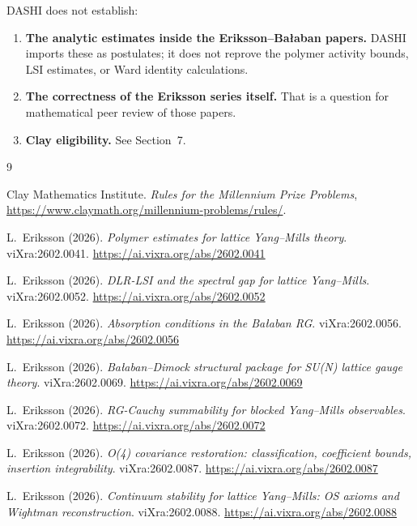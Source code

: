 \documentclass[11pt,a4paper]{article}
\begin{document}
DASHI does not establish:

\begin{enumerate}
\item[(A)] \textbf{The analytic estimates inside the Eriksson--Ba{\l}aban
  papers.}  DASHI imports these as postulates; it does not reprove the
  polymer activity bounds, LSI estimates, or Ward identity calculations.

\item[(B)] \textbf{The correctness of the Eriksson series itself.}  That is a
  question for mathematical peer review of those papers.

\item[(C)] \textbf{Clay eligibility.}  See Section~7.
\end{enumerate}

\begin{thebibliography}{9}

Clay Mathematics Institute.
\emph{Rules for the Millennium Prize Problems},
\url{https://www.claymath.org/millennium-problems/rules/}.

L.~Eriksson (2026).
\emph{Polymer estimates for lattice Yang--Mills theory}.
viXra:2602.0041.
\url{https://ai.vixra.org/abs/2602.0041}

L.~Eriksson (2026).
\emph{DLR-LSI and the spectral gap for lattice Yang--Mills}.
viXra:2602.0052.
\url{https://ai.vixra.org/abs/2602.0052}

L.~Eriksson (2026).
\emph{Absorption conditions in the Ba{\l}aban RG}.
viXra:2602.0056.
\url{https://ai.vixra.org/abs/2602.0056}

L.~Eriksson (2026).
\emph{Ba{\l}aban--Dimock structural package for SU(N) lattice gauge theory}.
viXra:2602.0069.
\url{https://ai.vixra.org/abs/2602.0069}

L.~Eriksson (2026).
\emph{RG-Cauchy summability for blocked Yang--Mills observables}.
viXra:2602.0072.
\url{https://ai.vixra.org/abs/2602.0072}

L.~Eriksson (2026).
\emph{O(4) covariance restoration: classification, coefficient bounds,
insertion integrability}.
viXra:2602.0087.
\url{https://ai.vixra.org/abs/2602.0087}

L.~Eriksson (2026).
\emph{Continuum stability for lattice Yang--Mills: OS axioms and Wightman
reconstruction}.
viXra:2602.0088.
\url{https://ai.vixra.org/abs/2602.0088}


\end{thebibliography}
\end{document}
